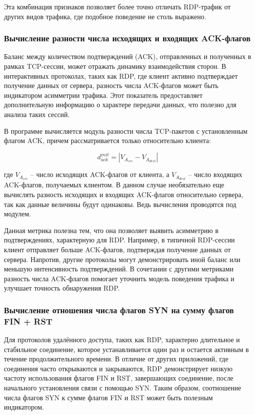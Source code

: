 \documentclass[bachelor, och, coursework]{SCWorks}
\begin{document}
Эта комбинация признаков позволяет более точно отличать RDP-трафик от других видов трафика, где подобное поведение не столь выражено.

\subsubsection{Вычисление разности числа исходящих и входящих ACK-флагов}

Баланс между количеством подтверждений (ACK), отправленных и полученных в рамках TCP-сессии, может отражать динамику 
взаимодействия сторон. В интерактивных протоколах, таких как RDP, где клиент активно подтверждает получение данных от 
сервера, разность числа ACK-флагов может быть индикатором асимметрии трафика. Этот показатель предоставляет дополнительную 
информацию о характере передачи данных, что полезно для анализа таких сессий.

В программе вычисляется модуль разности числа TCP-пакетов с установленным флагом ACK, причем рассматривается только относительно клиента:

\begin{equation}
  d_{ack}^{init} = | V_{A_{src}} - V_{A_{dest}} |
\end{equation}

где $V_{A_{src}}$ -- число исходящих ACK-флагов от клиента, а $V_{A_{dest}}$ -- число входящих ACK-флагов, получаемых клиентом. В данном случае необязательно
еще вычислять разность исходящих и входящих ACK-флагов относительно сервера, так как данные величины будут одинаковы. Ведь вычисления проводятся под модулем.

Данная метрика полезна тем, что она позволяет выявить асимметрию в подтверждениях, характерную для RDP. Например, в типичной RDP-сессии 
клиент отправляет больше ACK-флагов, подтверждая получение данных от сервера. Напротив, другие протоколы могут демонстрировать иной баланс 
или меньшую интенсивность подтверждений. В сочетании с другими метриками разность числа ACK-флагов помогает уточнить модель поведения трафика 
и улучшает точность обнаружения RDP.

\subsubsection{Вычисление отношения числа флагов SYN на сумму флагов FIN + RST}


Для протоколов удалённого доступа, таких как RDP, характерно длительное и стабильное 
соединение, которое устанавливается один раз и остается активным в течение продолжительного времени. В отличие от других приложений, 
где соединения часто открываются и закрываются, RDP демонстрирует низкую частоту использования флагов FIN и RST, завершающих соединение, 
после начального установления связи с помощью SYN. Таким образом, соотношение числа флагов SYN к сумме флагов FIN и RST может быть полезным индикатором.
\end{document}

